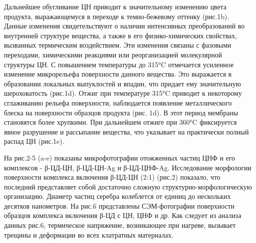 

\begin{multicols}{2}
Дальнейшее обугливание ЦН приводит к значительному изменению цвета
продукта, выражающемуся в переходе к темно-бежевому оттенку (рис.1b).
Данные изменения свидетельствуют о наличии интенсивных преобразований во
внутренней структуре вещества, а также в его физико-химических
свойствах, вызванных термическим воздействием. Эти изменения связаны с
фазовыми переходами, химическими реакциями или реорганизацией
молекулярной структуры ЦН. С повышением температуры до 315°C отмечается
усиленное изменение микрорельефа поверхности данного вещества. Это
выражается в образовании локальных выпуклостей и впадин, что придает ему
значительную шероховатость (рис.1d). Отжиг при температуре 315°C
приводит к некоторому сглаживанию рельефа поверхности, наблюдается
появление металлического блеска на поверхности образцов продукта (рис.
1d). В этот период мембраны становятся более хрупкими. При дальнейшем
отжиге при 360°C фиксируется явное разрушение и рассыпание вещества, что
указывает на практически полный распад ЦН (рис.1e).

На рис.2-5 (a-e) показаны микрофотографии отожженных частиц ЦНФ и его
комплексов - β-ЦД-ЦН, β-ЦД-ЦН-Ag и β-ЦД-ЦНФ-Ag. Исследование морфологии
поверхности комплекса включения β-ЦД-ЦН (2:1) (рис.2) показало, что
последний представляет собой достаточно сложную
структурно-морфологическую организацию. Диаметр частиц серебра
колеблется от единиц до нескольких десятков нанометров. На рис.6
представлены СЭМ-фотографии поверхности образцов комплекса включения
β-ЦД с ЦН, ЦНФ и др. Как следует из анализа данных рис.6, термическое
напряжение, возникающее при нагреве, вызывает трещины и деформации во
всех клатратных материалах.
\end{multicols}


